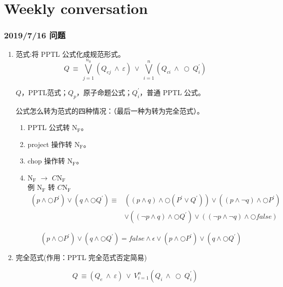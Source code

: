 \part{Weekly conversation}
\section{2019/7/16 问题}

\begin{enumerate}
  \item 范式:将 PPTL 公式化成规范形式。\\
  $$Q~\equiv~\bigvee_{j=1}^{n_{0}}\left(Q_{ej}~\wedge~\varepsilon\right)~\vee~\bigvee_{i=1}^{n}\left(Q_{ci}~\wedge~\bigcirc~Q_{i}^{\prime}\right)$$

  $Q$，PPTL范式；$Q_p$，原子命题公式；$Q_i^{\prime}$，普通 PPTL 公式。

   公式怎么转为范式的四种情况：（最后一种为转为完全范式）。
  \begin{enumerate}[(1)]
    \item PPTL 公式转 $\mathrm{N}_{\mathrm{F}}$。
    \item project 操作转 $\mathrm{N}_{\mathrm{F}}$。
    \item chop 操作转 $\mathrm{N}_{\mathrm{F}}$。
    \item $\mathrm{N}_{\mathrm{F}}$ $\rightarrow$ $C\mathrm{N}_{\mathrm{F}}$\\
    例 $\mathrm{N}_{\mathrm{F}}$ 转 $C\mathrm{N}_{\mathrm{F}}$
    $$\begin{aligned}\left(p \wedge \bigcirc P^{\prime}\right) \vee\left(q \wedge \bigcirc Q^{\prime}\right) \equiv &\left((p \wedge q) \wedge \bigcirc\left(P^{\prime} \vee Q^{\prime}\right)\right) \vee\left((p \wedge \neg q) \wedge \bigcirc P^{\prime}\right) \\ & \vee\left((\neg p \wedge q) \wedge \bigcirc Q^{\prime}\right) \vee((\neg p \wedge \neg q) \wedge \bigcirc f a l s e) \end{aligned}$$

    $$\left(p \wedge \bigcirc P^{\prime}\right) \vee\left(q \wedge \bigcirc Q^{\prime}\right)=false \wedge  \epsilon \vee \left(p \wedge \bigcirc P^{\prime}\right) \vee\left(q \wedge \bigcirc Q^{\prime}\right)$$
  \end{enumerate}
  \item 完全范式(作用：PPTL 完全范式否定简易)

  $$Q~\equiv\left(Q_{e}~\wedge~\varepsilon\right)~\vee~V_{i=1}^{n}\left(Q_{i}~\wedge~\bigcirc~Q_{i}^{\prime}\right)$$


\end{enumerate}
